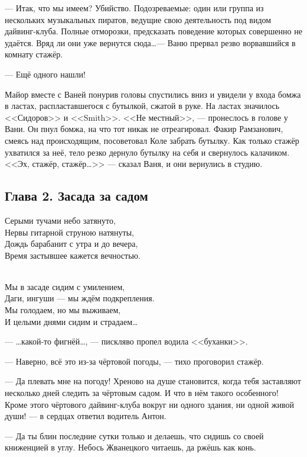 --- Итак, что мы имеем? Убийство. Подозреваемые: один или группа из нескольких музыкальных пиратов, ведущие свою деятельность под видом дайвинг-клуба. Полные отморозки, предсказать поведение которых совершенно не удаётся. Вряд ли они уже вернутся сюда\ldots --- Ваню прервал резво ворвавшийся в комнату стажёр.

--- Ещё одного нашли!

Майор вместе с Ваней понурив головы спустились вниз и увидели у входа бомжа в ластах, распластавшегося с бутылкой, сжатой в руке. На ластах значилось <<Сидоров>> и <<Smith>>. <<Не местный>>, --- пронеслось в голове у Вани. Он пнул бомжа, на что тот никак не отреагировал. Факир Рамзанович, смеясь над происходящим, посоветовал Коле забрать бутылку. Как только стажёр ухватился за неё, тело резко дернуло бутылку на себя и свернулось калачиком. <<Эх, стажёр, стажёр\ldots>> --- сказал Ваня, и они вернулись в студию.

\subsection*{Глава 2. Засада за садом}
\begin{center}
Серыми тучами небо затянуто,\\
Нервы гитарной струною натянуты,\\
Дождь барабанит с утра и до вечера,\\
Время застывшее кажется вечностью.

~\\
Мы в засаде сидим с умилением,\\
Даги, ингуши --- мы ждём подкрепления.\\
Мы голодаем, но мы выживаем,\\
И целыми днями сидим и страдаем\ldots
\end{center}

--- \ldots какой-то фигнёй\ldots, --- пискляво пропел водила <<буханки>>. 

--- Наверно, всё это из-за чёртовой погоды, --- тихо проговорил стажёр.

--- Да плевать мне на погоду! Хреново на душе становится, когда тебя заставляют несколько дней следить за чёртовым садом. И что в нём такого особенного! Кроме этого чёртового дайвинг-клуба вокруг ни одного здания, ни одной живой души! --- в сердцах ответил водитель Антон.

--- Да ты блин последние сутки только и делаешь, что сидишь со своей книженцией в углу. Небось Жванецкого читаешь, да ржёшь как конь.

